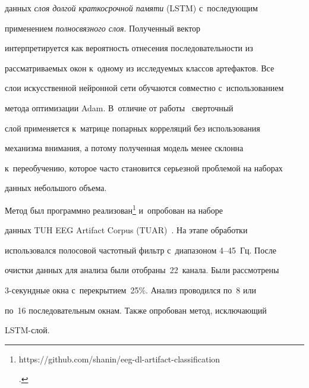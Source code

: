 данных \textit{слоя долгой краткосрочной памяти} (LSTM) с~последующим 

применением \textit{полносвязного слоя}. Полученный вектор 

интерпретируется как вероятность отнесения последовательности из 

рассматриваемых окон к~одному из исследуемых классов артефактов. Все 

слои искусственной нейронной сети обучаются совместно с~использованием 

метода оптимизации Adam. В~отличие от работы~\cite{6-sha} сверточный 

слой применяется к~матрице попарных корреляций без использования 

механизма внимания, а потому полученная модель менее склонна 

к~переобучению, которое часто становится серьезной проблемой на наборах 

данных небольшого объема.

     

      

     Метод был программно реализован\footnote{ {\sf 

https://github.com/shanin/eeg-dl-artifact-classification}.} и~опробован на наборе 

данных TUH EEG Artifact Corpus (TUAR)~\cite{13-sha}. На этапе обработки 

использовался полосовой частотный фильтр с~диапазоном 4--45~Гц. После 

очистки данных для анализа были отобраны~22~канала. Были рассмотрены  

3-се\-кунд\-ные окна с~перекрытием~25\%. Анализ проводился по~8 или 

по~16 последовательным окнам. Также опробован метод, исключающий 

LSTM-слой.

     

